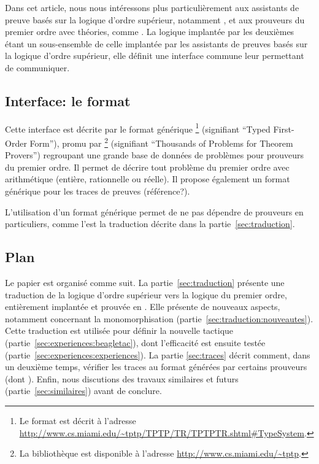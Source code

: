 Dans cet article, nous nous intéressons plus particulièrement aux
assistants de preuve basés sur la logique d'ordre supérieur, notamment
\holfour, et aux prouveurs du premier ordre avec théories, comme
\beagle. La logique implantée par les deuxièmes étant un sous-ensemble
de celle implantée par les assistants de preuves basés sur la logique
d'ordre supérieur, elle définit une interface commune leur permettant de
communiquer.


\subsection{Interface: le format \tff}

Cette interface est décrite par le format générique \tff\footnote{Le
  format \tff est décrit à l'adresse
  \url{http://www.cs.miami.edu/~tptp/TPTP/TR/TPTPTR.shtml\#TypeSystem}.}
(signifiant ``Typed First-Order Form''), promu par \tptp\footnote{La
  bibliothèque \tptp est disponible à l'adresse
  \url{http://www.cs.miami.edu/~tptp}.} (signifiant ``Thousands of
Problems for Theorem Provers'') regroupant une grande base de données de
problèmes pour prouveurs du premier ordre. Il permet de décrire tout
problème du premier ordre avec arithmétique (entière, rationnelle ou
réelle). Il propose également un format générique pour les traces de
preuves (\todo référence?).

L'utilisation d'un format générique permet de ne pas dépendre de
prouveurs en particuliers, comme l'est la traduction décrite dans la
partie~\ref{sec:traduction}.


\subsection{Plan}

Le papier est organisé comme suit. La partie~\ref{sec:traduction}
présente une traduction de la logique d'ordre supérieur vers la logique
du premier ordre, entièrement implantée et prouvée en \holfour. Elle
présente de nouveaux aspects, notamment concernant la monomorphisation
(partie~\ref{sec:traduction:nouveautes}). Cette traduction est utilisée
pour définir la nouvelle tactique \beagletac
(partie~\ref{sec:experiences:beagletac}), dont l'efficacité est ensuite
testée (partie~\ref{sec:experiences:experiences}). La partie
\ref{sec:traces} décrit comment, dans un deuxième temps, vérifier les
traces au format \tff générées par certains prouveurs (dont \beagle).
Enfin, nous discutions des travaux similaires et futurs
(partie~\ref{sec:similaires}) avant de conclure.




